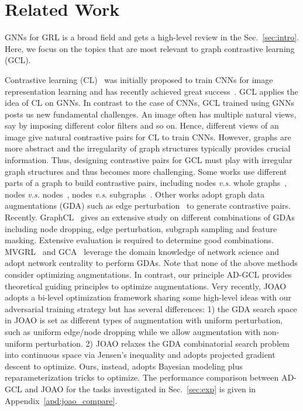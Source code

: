 \vspace{-6mm}
\section{Related Work}
\vspace{-2mm}
\label{sec:related}
GNNs for GRL is a broad field and gets a high-level review in the Sec.~\ref{sec:intro}. Here, we focus on the topics that are most relevant to graph contrastive learning (GCL). 

Contrastive learning (CL)~\cite{linsker1988self,becker1992self, henaff2020data, oord2018representation, tian2019contrastive,hjelm2018learning} was initially proposed to train CNNs for image representation learning and has recently achieved great success~\cite{chen2020simple,chen2020big}. GCL applies the idea of CL on GNNs. In contrast to the case of CNNs, GCL trained using GNNs posts us new fundamental challenges. An image often has multiple natural views, say by imposing different color filters and so on. Hence, different views of an image give natural contrastive pairs for CL to train CNNs. However, graphs are more abstract and the irregularity of graph structures typically provides crucial information. Thus, designing contrastive pairs for GCL must play with irregular graph structures and thus becomes more challenging. Some works use different parts of a graph to build contrastive pairs, including nodes \textit{v.s.} whole graphs~\cite{velivckovic2018deep,sun2019infograph}, nodes \textit{v.s.} nodes~\cite{peng2020graph}, nodes \textit{v.s.} subgraphs~\cite{jiao2020sub, hu2019strategies}.
Other works adopt graph data augmentations (GDA) such as edge perturbation~\cite{qiu2020gcc} to generate contrastive pairs. Recently. GraphCL~\cite{you2020graph} gives an extensive study on different combinations of GDAs including node dropping, edge perturbation, subgraph sampling and feature masking. Extensive evaluation is required to determine good combinations. MVGRL~\cite{hassani2020contrastive} and GCA~\cite{zhu2020graph} leverage the domain knowledge of network science and adopt network centrality to perform GDAs. Note that none of the above methods consider optimizing augmentations.  In contrast, our principle AD-GCL provides theoretical guiding principles to optimize augmentations. Very recently, JOAO~\cite{you2021graph} adopts a bi-level optimization framework sharing some high-level ideas with our adversarial training strategy but has several differences: 1) the GDA search space in JOAO is set as different types of augmentation with uniform perturbation, such as uniform edge/node dropping while we allow augmentation with non-uniform perturbation. 2) JOAO relaxes the GDA combinatorial search problem into continuous space via Jensen’s inequality and adopts projected gradient descent to optimize. Ours, instead, adopts Bayesian modeling plus reparameterization tricks to optimize. The performance comparison between AD-GCL and JOAO for the tasks investigated in Sec.~\ref{sec:exp} is given in Appendix~\ref{apd:joao_compare}. %

